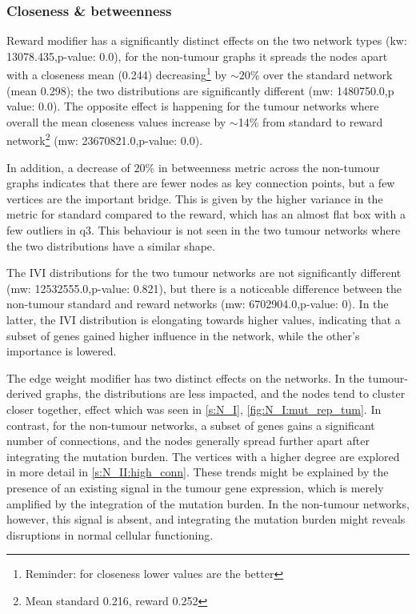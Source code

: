 \subsubsection*{Closeness \& betweenness}

Reward modifier has a significantly distinct effects on the two network types (\acrshort{kw}: 13078.435,p-value: 0.0), for the non-tumour graphs it spreads the nodes apart with a closeness mean (0.244) decreasing\footnote{Reminder: for closeness lower values are the better} by $\sim20$\% over the standard network (mean 0.298); the two distributions are significantly different (\acrshort{mw}: 1480750.0,p value: 0.0). The opposite effect is happening for the tumour networks where overall the mean closeness values increase by $\sim$14\% from standard to reward network\footnote{Mean standard 0.216, reward 0.252} (\acrshort{mw}: 23670821.0,p-value: 0.0).

In addition, a decrease of $20$\% in betweenness metric across the non-tumour graphs indicates that there are fewer nodes as key connection points, but a few vertices are the important bridge. This is given by the higher variance in the metric for standard compared to the reward, which has an almost flat box with a few outliers in q3. This behaviour is not seen in the two tumour networks where the two distributions have a similar shape.

The IVI distributions for the two tumour networks are not significantly different (\acrshort{mw}: 12532555.0,p-value: 0.821), but there is a noticeable difference between the non-tumour standard and reward networks (\acrshort{mw}: 6702904.0,p-value: 0). In the latter, the IVI distribution is elongating towards higher values, indicating that a subset of genes gained higher influence in the network, while the other's importance is lowered.


The edge weight modifier has two distinct effects on the networks. In the tumour-derived graphs, the distributions are less impacted, and the nodes tend to cluster closer together, effect which was seen in \cref{s:N_I}, \cref{fig:N_I:mut_rep_tum}. In contrast, for the non-tumour networks, a subset of genes gains a significant number of connections, and the nodes generally spread further apart after integrating the mutation burden. The vertices with a higher degree are explored in more detail in \cref{s:N_II:high_conn}. These trends might be explained by the presence of an existing signal in the tumour gene expression, which is merely amplified by the integration of the mutation burden. In the non-tumour networks, however, this signal is absent, and integrating the mutation burden might reveals disruptions in normal cellular functioning.

